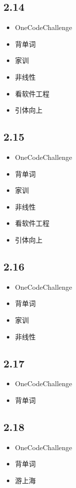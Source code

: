 \documentclass[UTF8]{ctexart}
\begin{document}
\subsection*{2.14}
\begin{itemize}
    \item OneCodeChallenge
    \item 背单词
    \item 家训
    \item 非线性
    \item 看软件工程
    \item 引体向上
\end{itemize}

\subsection*{2.15}
\begin{itemize}
    \item OneCodeChallenge
    \item 背单词
    \item 家训
    \item 非线性
    \item 看软件工程
    \item 引体向上
\end{itemize}

\subsection*{2.16}
\begin{itemize}
    \item OneCodeChallenge
    \item 背单词
    \item 家训
    \item 非线性
\end{itemize}

\subsection*{2.17}
\begin{itemize}
    \item OneCodeChallenge
    \item 背单词
\end{itemize}

\subsection*{2.18}
\begin{itemize}
    \item OneCodeChallenge
    \item 背单词
    \item 游上海
\end{itemize}
\end{document}
